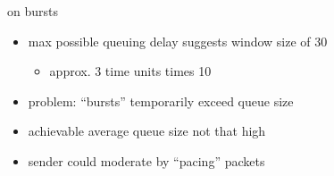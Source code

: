 \begin{frame}{on bursts}
    \begin{itemize}
    \item max possible queuing delay suggests window size of 30
        \begin{itemize}
        \item approx. 3 time units times 10
        \end{itemize}
    \item problem: ``bursts'' temporarily exceed queue size
    \vspace{.5cm}
    \item achievable average queue size not that high
    \item sender could moderate by ``pacing'' packets
    \end{itemize}
\end{frame}
